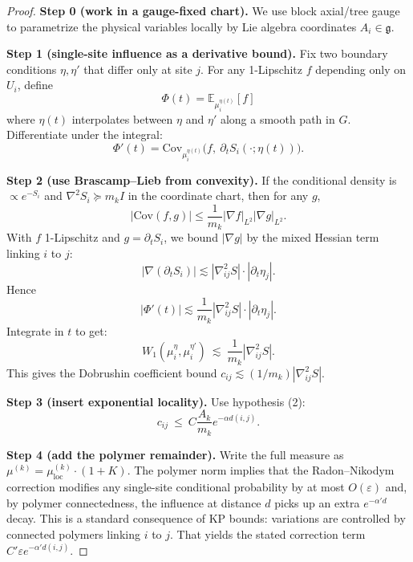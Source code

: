 \begin{proof}
\textbf{Step 0 (work in a gauge-fixed chart).}
We use block axial/tree gauge to parametrize the physical variables locally by Lie algebra coordinates $A_i\in\mathfrak g$.

\textbf{Step 1 (single-site influence as a derivative bound).}
Fix two boundary conditions $\eta,\eta'$ that differ only at site $j$. For any 1-Lipschitz $f$ depending only on $U_i$, define
\begin{equation}
\Phi(t)=\mathbb E_{\mu_i^{\eta(t)}}[f]
\end{equation}
where $\eta(t)$ interpolates between $\eta$ and $\eta'$ along a smooth path in $G$.
Differentiate under the integral:
\begin{equation}
\Phi'(t)=\mathrm{Cov}_{\mu_i^{\eta(t)}}\bigl(f,\ \partial_t S_i(\cdot;\eta(t))\bigr).
\end{equation}

\textbf{Step 2 (use Brascamp--Lieb from convexity).}
If the conditional density is $\propto e^{-S_i}$ and $\nabla^2 S_i\succeq m_k I$ in the coordinate chart, then for any $g$,
\begin{equation}
|\mathrm{Cov}(f,g)| \le \frac{1}{m_k}|\nabla f|_{L^2}|\nabla g|_{L^2}.
\end{equation}
With $f$ 1-Lipschitz and $g=\partial_t S_i$, we bound $|\nabla g|$ by the mixed Hessian term linking $i$ to $j$:
\begin{equation}
|\nabla(\partial_t S_i)|\lesssim |\nabla^2_{ij}S|\cdot |\partial_t \eta_j|.
\end{equation}
Hence
\begin{equation}
|\Phi'(t)|\lesssim \frac{1}{m_k}|\nabla^2_{ij}S|\cdot |\partial_t \eta_j|.
\end{equation}
Integrate in $t$ to get:
\begin{equation}
W_1(\mu_i^\eta,\mu_i^{\eta'})\ \lesssim\ \frac{1}{m_k}|\nabla^2_{ij}S|.
\end{equation}
This gives the Dobrushin coefficient bound $c_{ij}\lesssim (1/m_k)|\nabla^2_{ij}S|$.

\textbf{Step 3 (insert exponential locality).}
Use hypothesis (2):
\begin{equation}
c_{ij}\ \le\ C\frac{A_k}{m_k}e^{-\alpha d(i,j)}.
\end{equation}

\textbf{Step 4 (add the polymer remainder).}
Write the full measure as $\mu^{(k)}=\mu^{(k)}_{\mathrm{loc}}\cdot(1+K)$. The polymer norm implies that the Radon--Nikodym correction modifies any single-site conditional probability by at most $O(\varepsilon)$ and, by polymer connectedness, the influence at distance $d$ picks up an extra $e^{-\alpha'd}$ decay. This is a standard consequence of KP bounds: variations are controlled by connected polymers linking $i$ to $j$.
That yields the stated correction term $C'\varepsilon e^{-\alpha' d(i,j)}$.
\end{proof}

